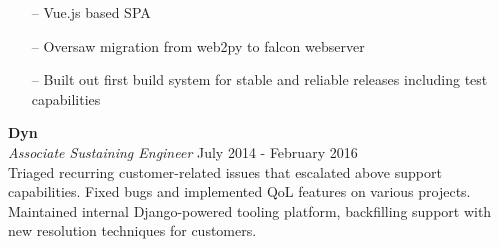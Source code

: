 \begin{minipage}[t]{\linewidth}
    \begin{itemize}
        \item[--] Vue.js based SPA
        \item[--] Oversaw migration from web2py to falcon webserver
        \item[--] Built out first build system for stable and reliable releases including test capabilities
    \end{itemize}
    \end{minipage}

\large{\textbf{Dyn}} \\
\textit{Associate Sustaining Engineer} \hfill July 2014 - February 2016 \\[3.75pt]
Triaged recurring customer-related issues that escalated above support capabilities. Fixed bugs and implemented QoL features on various projects. Maintained internal Django-powered tooling platform, backfilling support with new resolution techniques for customers.
